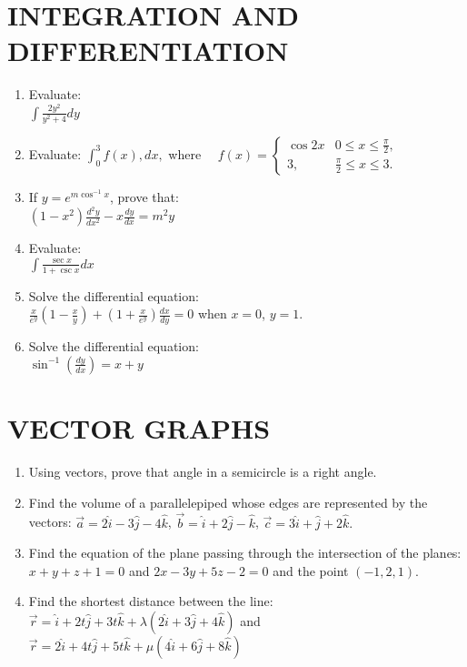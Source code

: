 \documentclass[12pt]{article}
\begin{document}
		\section{INTEGRATION AND DIFFERENTIATION}
		\begin{enumerate}
\item Evaluate:\\

$ \int \frac{2y^2}{y^2 + 4} dy $ 
\item Evaluate:
	$\int_0^3 f(x) , dx,$ where $\quad  f(x) =\begin{cases}
		\cos2x & 0 \leq x \leq \frac{\pi}{2}, \\3, &  \frac{\pi}{2} \leq x \leq 3.
	\end{cases}$
\item If $y = e^{m \cos^{-1} x}$, prove that:\\
	$ (1 - x^2) \frac{d^2 y}{dx^2} - x \frac{dy}{dx} = m^2 y $
\item Evaluate:\\
	$ \int \frac{\sec x}{1 + \csc x} dx $
\item Solve the differential equation:\\

	$\frac{x}{e^y}\left(1 - \frac{x}{y}\right) + \left(1 + \frac{x}{e^y}\right) \frac{dx}{dy} = 0$ when $x = 0$, $y = 1$.
				
				\item Solve the differential equation:\\
					$\sin^{-1} \left( \frac{dy}{dx} \right) = x + y$
		\end{enumerate}
\section{VECTOR GRAPHS}
\begin{enumerate}
	    \item Using vectors, prove that angle in a semicircle is a right angle.
	    \item Find the volume of a parallelepiped whose edges are represented by the vectors:
		    $\vec{a} = 2\hat{i} - 3\hat{j} - 4\hat{k}$, $\vec{b} = \hat{i} +2\hat{j} - \hat{k}$, $\vec{c} = 3\hat{i} + \hat{j} + 2\hat{k}.$
	    \item Find the equation of the plane passing through the intersection of the planes:
 $  x + y + z + 1 = 0 $  and $ 2x - 3y + 5z - 2 = 0 $ and the point $( -1, 2, 1).$
 \item Find the shortest distance between the line:
	 $ \vec{r} = \hat{i} + 2t\hat{j} + 3t\hat{k} + \lambda(2\hat{i} + 3\hat{j} + 4\hat{k}) $ and $\vec{r} = 2\hat{i} + 4t\hat{j}+ 5t\hat{k} + \mu(4\hat{i} + 6\hat{j} + 8\hat{k}) $
\end{enumerate}
\end{document}
